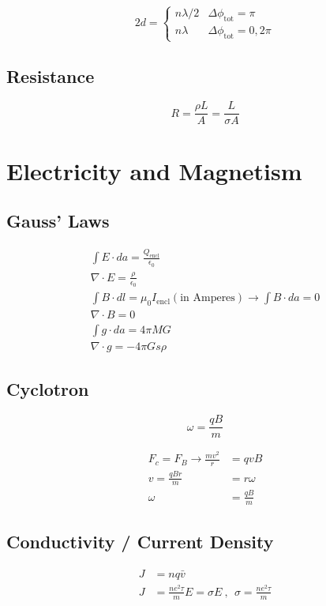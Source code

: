 \documentclass[10pt,letter]{article}
\begin{document}
\[
2d = 
  \begin{cases}
   n\lambda/2 & \Delta \phi_\textrm{tot} = \pi\\
   n\lambda & \Delta \phi_\textrm{tot} = 0, 2\pi
  \end{cases}
\]

\subsection{Resistance}
\begin{equation}
 R = \frac{\rho L }{A} = \frac{L}{\sigma A} 
\end{equation}


\section{Electricity and Magnetism}
\subsection{Gauss' Laws}
\begin{align}
 \int E\cdot da = \frac{Q_{\textrm{encl}}}{\epsilon_0}\\
 \nabla \cdot E = \frac{\rho}{\epsilon_0}\\
 \int B\cdot dl = \mu_0 I_{\textrm{encl}}(\textrm{in Amperes}) \rightarrow \int B \cdot da = 0\\
 \nabla \cdot B = 0 \\
 \int g\cdot da = 4 \pi M G\\
 \nabla \cdot g = -4\pi Gs\rho
\end{align}

\subsection{Cyclotron}
\begin{equation}
 \omega = \frac{qB}{m}
\end{equation}

\begin{align}
 F_c = F_B \rightarrow \frac{mv^2}{r} &= qvB\\
 v= \frac{qBr}{m} &= r\omega\\
 \omega &= \frac{qB}{m}
\end{align}

\subsection{Conductivity / Current Density}
\begin{align}
 J &= nq\bar{v}\\
 J &= \frac{ne^2\tau}{m}E = \sigma E~,~~\sigma = \frac{ne^2\tau}{m}
\end{align}
\end{document}
